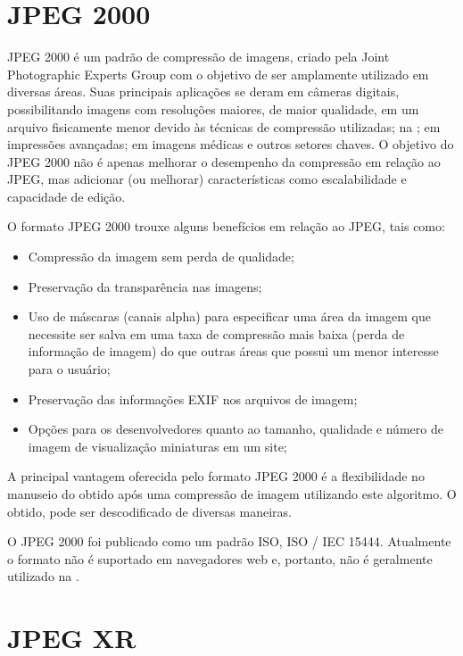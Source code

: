 \documentclass[espaco=simples,appendix=Name]{abnt}
\begin{document}
\section{JPEG 2000}

JPEG 2000 é um padrão de compressão de imagens, criado pela Joint Photographic Experts Group com o objetivo de ser amplamente utilizado em diversas áreas. Suas principais aplicações se deram em câmeras digitais, possibilitando imagens com resoluções maiores, de maior qualidade, em um arquivo fisicamente menor devido às técnicas de compressão utilizadas; na ; em impressões avançadas; em imagens médicas e outros setores chaves. O objetivo do JPEG 2000 não é apenas melhorar o desempenho da compressão em relação ao JPEG, mas adicionar (ou melhorar) características como escalabilidade e capacidade de edição.

O formato JPEG 2000 trouxe alguns benefícios em relação ao JPEG, tais como:
\begin{itemize}
	\item Compressão da imagem sem perda de qualidade;
	\item Preservação da transparência nas imagens;
	\item Uso de máscaras (canais alpha) para especificar uma área da imagem que necessite ser salva em uma taxa de compressão mais baixa (perda de informação de imagem) do que outras áreas que possui um menor interesse para o usuário;
	\item Preservação das informações EXIF nos arquivos de imagem;
	\item Opções para os desenvolvedores quanto ao tamanho, qualidade e número de imagem de visualização miniaturas em um site;
\end{itemize}

A principal vantagem oferecida pelo formato JPEG 2000 é a flexibilidade no manuseio do  obtido após uma compressão de imagem utilizando este algoritmo. O  obtido, pode ser descodificado de diversas maneiras. \cite{JPEG2000Codestreams}

O JPEG 2000 foi publicado como um padrão ISO, ISO / IEC 15444. Atualmente o formato não é suportado em navegadores web e, portanto, não é geralmente utilizado na .\cite{JPEG}

\section{JPEG XR}
\end{document}
